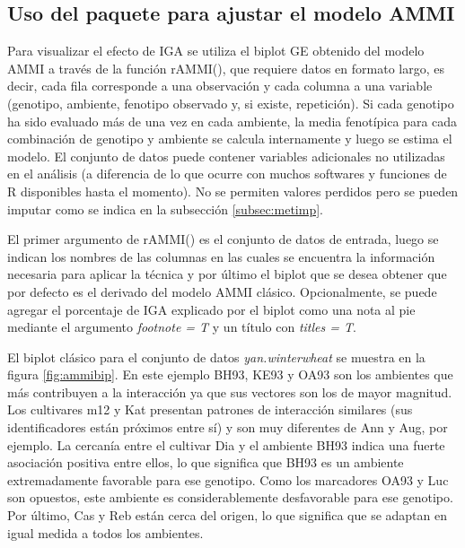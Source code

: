   
\subsection{Uso del paquete para ajustar el modelo AMMI}

Para visualizar el efecto de IGA se utiliza el biplot GE obtenido del modelo AMMI a través de la función \textcolor{fandango}{rAMMI()}, que requiere datos en formato largo, es decir, cada fila corresponde a una observación y cada columna a una variable (genotipo, ambiente, fenotipo observado y, si existe, repetición). Si cada genotipo ha sido evaluado más de una vez en cada ambiente, la media fenotípica para cada combinación de genotipo y ambiente se calcula internamente y luego se estima el modelo. El conjunto de datos puede contener variables adicionales no utilizadas en el análisis (a diferencia de lo que ocurre con muchos softwares y funciones de R disponibles hasta el momento). No se permiten valores perdidos pero se pueden imputar como se indica en la subsección \ref{subsec:metimp}. 

El primer argumento de \textcolor{fandango}{rAMMI()} es el conjunto de datos de entrada, luego se indican los nombres de las columnas en las cuales se encuentra la información necesaria para aplicar la técnica y por último el biplot que se desea obtener que por defecto es el derivado del modelo AMMI clásico. Opcionalmente, se puede agregar el porcentaje de IGA explicado por el biplot como una nota al pie mediante el argumento \emph{footnote = T} y un título con \emph{titles = T}. 

El biplot clásico para el conjunto de datos \emph{yan.winterwheat} se muestra en la figura
\ref{fig:ammibip}. En este ejemplo BH93, KE93 y OA93 son los ambientes que más contribuyen a la interacción ya que sus vectores son los de mayor magnitud. Los cultivares m12 y Kat presentan patrones de interacción similares (sus identificadores están próximos entre sí) y son muy diferentes de Ann y Aug, por ejemplo. La cercanía entre el cultivar Dia y el ambiente BH93 indica una fuerte asociación positiva entre ellos, lo que significa que BH93 es un ambiente extremadamente favorable para ese genotipo. Como los marcadores OA93 y Luc son opuestos, este ambiente es considerablemente desfavorable para ese genotipo. Por último, Cas y Reb están cerca del origen, lo que significa que se adaptan en igual medida a todos los ambientes.

